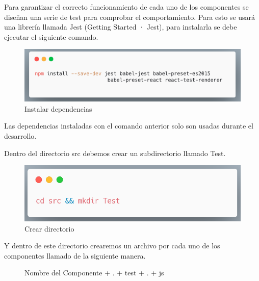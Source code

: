 Para garantizar el correcto funcionamiento de cada uno de los componentes se diseñan una serie de test para comprobar el comportamiento. Para esto se usará una librería llamada Jest \cite{jest} (Getting Started · Jest), para instalarla se debe ejecutar el siguiente comando.
\newline
\begin{figure}[H]
    \includegraphics[width=1\textwidth]{./Imagenes/8.39t.png}
    \caption[Instalar dependencias]{Instalar dependencias}
    \end{figure}
\newline
Las dependencias instaladas con el comando anterior solo son usadas durante el desarrollo.

Dentro del directorio src debemos crear un subdirectorio llamado Test.
\newline
\begin{figure}[H]
    \includegraphics[width=1\textwidth]{./Imagenes/8.40t.png}
    \caption[Crear directorio]{Crear directorio}
    \end{figure}
\newline
Y dentro de este directorio crearemos un archivo por cada uno de los componentes llamado de la siguiente manera.
\begin{figure}[H]
   Nombre del Componente + . + test + . + js
    \centering
    \end{figure}
    
